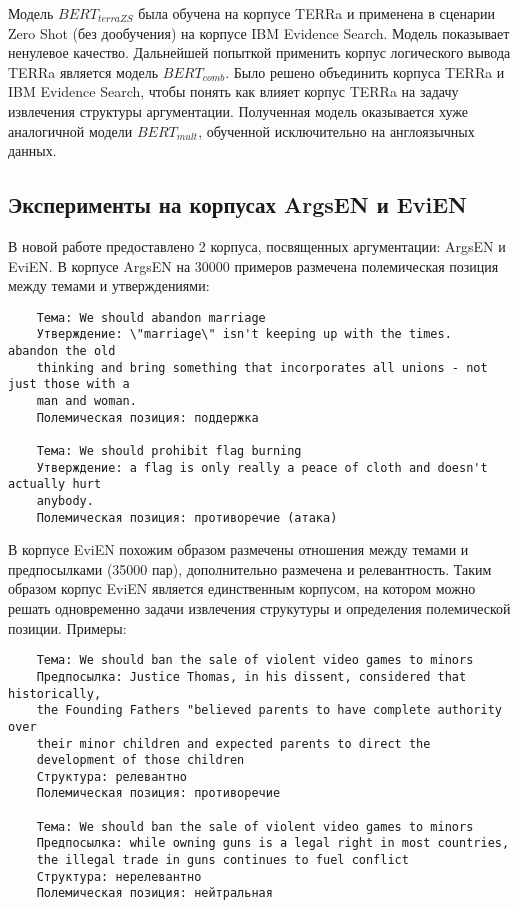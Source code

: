 Модель $BERT_{terraZS}$ была обучена на корпусе TERRa и применена в сценарии Zero Shot (без дообучения) на корпусе IBM Evidence Search. Модель показывает ненулевое качество. Дальнейшей попыткой применить корпус логического вывода TERRa является модель $BERT_{comb}$. Было решено объединить корпуса TERRa и IBM Evidence Search, чтобы понять как влияет корпус TERRa на задачу извлечения структуры аргументации. Полученная модель оказывается хуже аналогичной модели $BERT_{mult}$, обученной исключительно на англоязычных данных.

\subsection{Эксперименты на корпусах ArgsEN и EviEN}
В новой работе \cite{toledo2020multilingual} предоставлено 2 корпуса, посвященных аргументации: ArgsEN и EviEN. В корпусе ArgsEN на 30000 примеров размечена полемическая позиция между темами и утверждениями:

\begin{verbatim}
    Тема: We should abandon marriage
    Утверждение: \"marriage\" isn't keeping up with the times.  abandon the old
    thinking and bring something that incorporates all unions - not just those with a
    man and woman.
    Полемическая позиция: поддержка
    
    Тема: We should prohibit flag burning
    Утверждение: a flag is only really a peace of cloth and doesn't actually hurt
    anybody.
    Полемическая позиция: противоречие (атака)
\end{verbatim}

В корпусе EviEN похожим образом размечены отношения между темами и предпосылками (35000 пар), дополнительно размечена и релевантность. Таким образом корпус EviEN является единственным корпусом, на котором можно решать одновременно задачи извлечения струкутуры и определения полемической позиции. Примеры:

\begin{verbatim}
    Тема: We should ban the sale of violent video games to minors
    Предпосылка: Justice Thomas, in his dissent, considered that historically, 
    the Founding Fathers "believed parents to have complete authority over 
    their minor children and expected parents to direct the 
    development of those children
    Структура: релевантно
    Полемическая позиция: противоречие
    
    Тема: We should ban the sale of violent video games to minors
    Предпосылка: while owning guns is a legal right in most countries, 
    the illegal trade in guns continues to fuel conflict
    Структура: нерелевантно
    Полемическая позиция: нейтральная
\end{verbatim}

